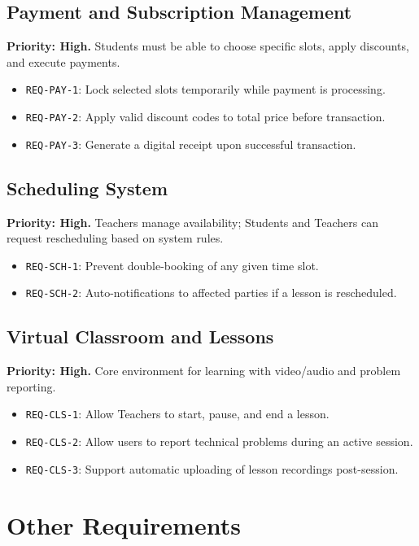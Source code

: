 \documentclass[11pt,a4paper]{article}
\begin{document}
\subsection{Payment and Subscription Management}
\textbf{Priority: High.} Students must be able to choose specific slots, apply discounts, and execute payments.
\begin{itemize}[label=--]
    \item \texttt{REQ-PAY-1}: Lock selected slots temporarily while payment is processing.
    \item \texttt{REQ-PAY-2}: Apply valid discount codes to total price before transaction.
    \item \texttt{REQ-PAY-3}: Generate a digital receipt upon successful transaction.
\end{itemize}

\subsection{Scheduling System}
\textbf{Priority: High.} Teachers manage availability; Students and Teachers can request rescheduling based on system rules.
\begin{itemize}[label=--]
    \item \texttt{REQ-SCH-1}: Prevent double-booking of any given time slot.
    \item \texttt{REQ-SCH-2}: Auto-notifications to affected parties if a lesson is rescheduled.
\end{itemize}

\subsection{Virtual Classroom and Lessons}
\textbf{Priority: High.} Core environment for learning with video/audio and problem reporting.
\begin{itemize}[label=--]
    \item \texttt{REQ-CLS-1}: Allow Teachers to start, pause, and end a lesson.
    \item \texttt{REQ-CLS-2}: Allow users to report technical problems during an active session.
    \item \texttt{REQ-CLS-3}: Support automatic uploading of lesson recordings post-session.
\end{itemize}

\section{Other Requirements}
\end{document}
